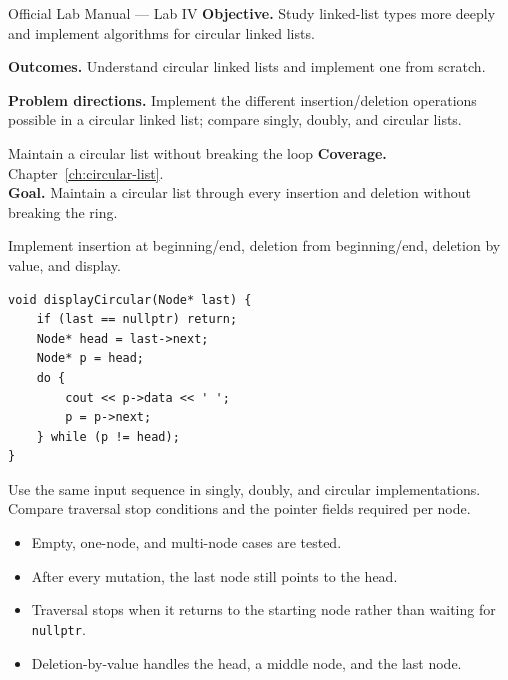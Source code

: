 
\begin{sourcealignment}{Official Lab Manual --- Lab IV}
\textbf{Objective.} Study linked-list types more deeply and implement algorithms for circular linked lists.

\textbf{Outcomes.} Understand circular linked lists and implement one from scratch.

\textbf{Problem directions.} Implement the different insertion/deletion operations possible in a circular linked list; compare singly, doubly, and circular lists.
\end{sourcealignment}

\begin{labproject}{Maintain a circular list without breaking the loop}
\textbf{Coverage.} Chapter~\ref{ch:circular-list}.\\
\textbf{Goal.} Maintain a circular list through every insertion and deletion without breaking the ring.

Implement insertion at beginning/end, deletion from beginning/end, deletion by value, and display.

\begin{lstlisting}
void displayCircular(Node* last) {
    if (last == nullptr) return;
    Node* head = last->next;
    Node* p = head;
    do {
        cout << p->data << ' ';
        p = p->next;
    } while (p != head);
}
\end{lstlisting}

\begin{tryit}
Use the same input sequence in singly, doubly, and circular implementations. Compare traversal stop conditions and the pointer fields required per node.
\end{tryit}
\end{labproject}

\begin{verification}
\begin{itemize}
  \item Empty, one-node, and multi-node cases are tested.
  \item After every mutation, the last node still points to the head.
  \item Traversal stops when it returns to the starting node rather than waiting for \texttt{nullptr}.
  \item Deletion-by-value handles the head, a middle node, and the last node.
\end{itemize}
\end{verification}


